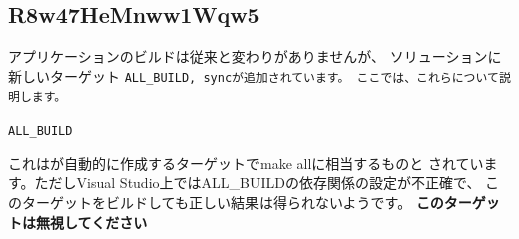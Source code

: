 \subsection{R8w47HeMnww1Wqw5}
\label{subsec:BuildApplication}

\noindent
\KLUDGE アプリケーションのビルドは従来と変わりがありませんが、
\KLUDGE ソリューションに新しいターゲット
\tt{ALL\_BUILD}, \tt{sync}\KLUDGE が追加されています。
\KLUDGE ここでは、これらについて説明します。

\medskip
\noindent
\tt{ALL\_BUILD}
\begin{narrow}[20pt]
	\KLUDGE これは\cmake \KLUDGE が自動的に作成するターゲットでmake all\KLUDGE に相当するものと
	\KLUDGE されています。ただしVisual Studio\KLUDGE 上ではALL\_BUILD\KLUDGE の依存関係の設定が不正確で、
	\KLUDGE このターゲットをビルドしても正しい結果は得られないようです。
	{\bf{\KLUDGE このターゲットは無視してください}}
\end{narrow}


